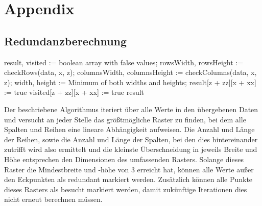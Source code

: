 \chapter{Appendix}

\section{Redundanzberechnung}\label{redundanzberechnung}
\begin{algorithm}[H]
\begin{algorithmic}
    \State result, visited := boolean array with false values;
            \State rowsWidth, rowsHeight := checkRows(data, x, z);
            \State columnsWidth, columnsHeight := checkColumns(data, x, z);
            \State width, height := Minimum of both widths and heights;
                        \State result[z + zz][x + xx] := true
                    \EndIf
                    \State visited[z + zz][x + xx] := true
                \EndFor             
            \EndIf
        \EndIf     
    \EndFor
    \State\Return result
\EndProcedure
\end{algorithmic}
\end{algorithm}

Der beschriebene Algorithmus iteriert über alle Werte in den übergebenen Daten und versucht an jeder Stelle das größtmögliche Raster zu finden, bei dem alle Spalten und Reihen eine lineare Abhängigkeit aufweisen. Die Anzahl und Länge der Reihen, sowie die Anzahl und Länge der Spalten, bei den dies hintereinander zutrifft wird also ermittelt und die kleinste Überschneidung in jeweils Breite und Höhe entsprechen den Dimensionen des umfassenden Rasters. Solange dieses Raster die Mindestbreite und -höhe von 3 erreicht hat, können alle Werte außer den Eckpunkten als redundant markiert werden. Zusätzlich können alle Punkte dieses Rasters als besucht markiert werden, damit zukünftige Iterationen dies nicht erneut berechnen müssen.

